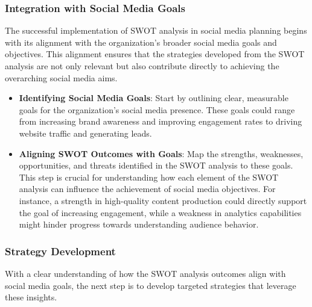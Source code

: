 \documentclass[
]{book}
\providecommand{\tightlist}{%
  \setlength{\itemsep}{0pt}\setlength{\parskip}{0pt}}
\begin{document}
\hypertarget{integration-with-social-media-goals}{%
\subsubsection*{Integration with Social Media Goals}\label{integration-with-social-media-goals}}

The successful implementation of SWOT analysis in social media planning begins with its alignment with the organization's broader social media goals and objectives. This alignment ensures that the strategies developed from the SWOT analysis are not only relevant but also contribute directly to achieving the overarching social media aims.

\begin{itemize}
\tightlist
\item
  \textbf{Identifying Social Media Goals}: Start by outlining clear, measurable goals for the organization's social media presence. These goals could range from increasing brand awareness and improving engagement rates to driving website traffic and generating leads.
\item
  \textbf{Aligning SWOT Outcomes with Goals}: Map the strengths, weaknesses, opportunities, and threats identified in the SWOT analysis to these goals. This step is crucial for understanding how each element of the SWOT analysis can influence the achievement of social media objectives. For instance, a strength in high-quality content production could directly support the goal of increasing engagement, while a weakness in analytics capabilities might hinder progress towards understanding audience behavior.
\end{itemize}

\hypertarget{strategy-development}{%
\subsubsection*{Strategy Development}\label{strategy-development}}

With a clear understanding of how the SWOT analysis outcomes align with social media goals, the next step is to develop targeted strategies that leverage these insights.
\end{document}
